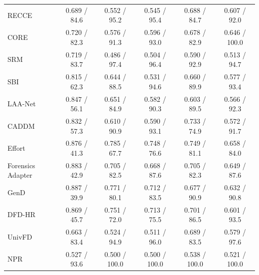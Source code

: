 \begin{tabular}{@{}l ccccc@{}}
RECCE & 0.689 / 84.6 & 0.552 / 95.2 & 0.545 / 95.4 & 0.688 / 84.7 & 0.607 / 92.0 \\
CORE & 0.720 / 82.3 & 0.576 / 91.3 & 0.596 / 93.0 & 0.678 / 82.9 & 0.646 / 100.0 \\
SRM & 0.719 / 83.7 & 0.486 / 97.4 & 0.504 / 96.4 & 0.590 / 92.9 & 0.513 / 94.7 \\
SBI & 0.815 / 62.3 & 0.644 / 88.5 & 0.531 / 94.6 & 0.660 / 89.9 & 0.577 / 93.4 \\
LAA-Net & 0.847 / 56.1 & 0.651 / 84.9 & 0.582 / 90.3 & 0.603 / 89.5 & 0.566 / 92.3 \\
CADDM & 0.832 / 57.3 & 0.610 / 90.9 & 0.590 / 93.1 & 0.733 / 74.9 & 0.572 / 91.7 \\
Effort & 0.876 / 41.3 & 0.785 / 67.7 & 0.748 / 76.6 & 0.749 / 81.1 & 0.658 / 84.0 \\
Forensics Adapter & 0.883 / 42.9 & 0.705 / 82.5 & 0.668 / 87.6 & 0.705 / 82.3 & 0.649 / 87.6 \\
GenD & 0.887 / 39.9 & 0.771 / 80.1 & 0.712 / 83.5 & 0.677 / 90.9 & 0.632 / 90.8 \\
DFD-HR & 0.869 / 45.7 & 0.751 / 72.0 & 0.713 / 75.5 & 0.701 / 86.5 & 0.601 / 93.5 \\
UnivFD & 0.663 / 83.4 & 0.524 / 94.9 & 0.511 / 96.0 & 0.689 / 83.5 & 0.579 / 97.6 \\
NPR & 0.527 / 93.6 & 0.500 / 100.0 & 0.500 / 100.0 & 0.538 / 100.0 & 0.521 / 100.0 \\
\bottomrule
\end{tabular}
